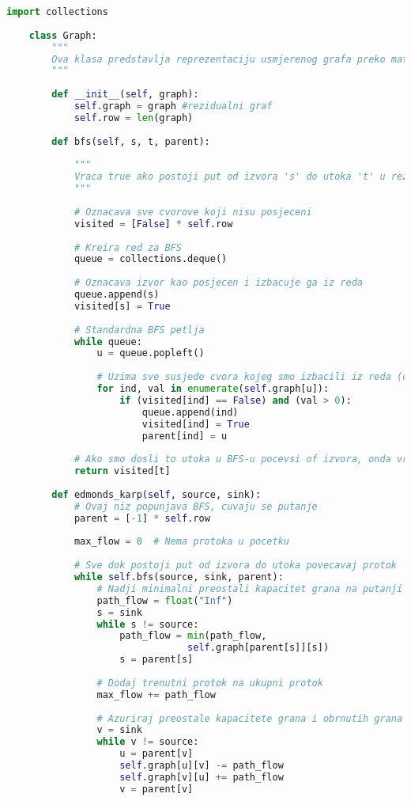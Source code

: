 \documentclass[11pt, a4paper]{article}
\begin{document}
	\begin{lstlisting}[language=Python]
	import collections
	
	class Graph:
		"""
		Ova klasa predstavlja reprezentaciju usmjerenog grafa preko matrice susjedstva.
		"""
		
		def __init__(self, graph):
			self.graph = graph #rezidualni graf
			self.row = len(graph)
		
		def bfs(self, s, t, parent):
			
			"""
			Vraca true ako postoji put od izvora 's' do utoka 't' u rezidualnom grafu. Takodjer popunjava parent[] kako bi sacuvao putanju.
			"""
			
			# Oznacava sve cvorove koji nisu posjeceni
			visited = [False] * self.row
			
			# Kreira red za BFS
			queue = collections.deque()
			
			# Oznacava izvor kao posjecen i izbacuje ga iz reda
			queue.append(s)
			visited[s] = True
			
			# Standardna BFS petlja
			while queue:
				u = queue.popleft()
				
				# Uzima sve susjede cvora kojeg smo izbacili iz reda (cvor u). Ako susjed nije posjecen onda ga oznacavamo kao posjecenog i izbacujemo iz reda
				for ind, val in enumerate(self.graph[u]):
					if (visited[ind] == False) and (val > 0):
						queue.append(ind)
						visited[ind] = True
						parent[ind] = u
				
			# Ako smo dosli to utoka u BFS-u pocevsi of izvora, onda vracamo true, inace false
			return visited[t]
		
		def edmonds_karp(self, source, sink):
			# Ovaj niz popunjava BFS, cuvaju se putanje
			parent = [-1] * self.row
			
			max_flow = 0  # Nema protoka u pocetku
			
			# Sve dok postoji put od izvora do utoka povecavaj protok
			while self.bfs(source, sink, parent):
				# Nadji minimalni preostali kapacitet grana na putanji koju je popunio BFS. Odnosno, nadji maksimalni protok kroz tu putanju.
				path_flow = float("Inf")
				s = sink
				while s != source:
					path_flow = min(path_flow,
								self.graph[parent[s]][s])
					s = parent[s]
				
				# Dodaj trenutni protok na ukupni protok
				max_flow += path_flow
				
				# Azuriraj preostale kapacitete grana i obrnutih grana na putanji
				v = sink
				while v != source:
					u = parent[v]
					self.graph[u][v] -= path_flow
					self.graph[v][u] += path_flow
					v = parent[v]
				

\end{lstlisting}
\end{document}

